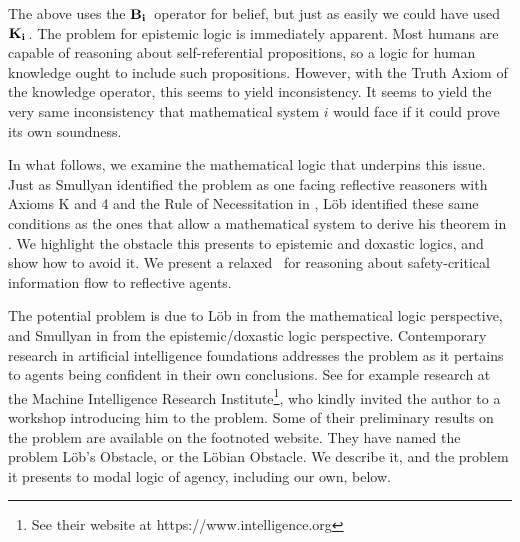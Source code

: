 The above uses the $\mathbf{B}_{\mathbf{i}}\,$ operator for belief, but just as easily we could have used $\mathbf{K}_{\mathbf{i}}\,$. The problem for epistemic logic is immediately apparent. Most humans are capable of reasoning about self-referential propositions, so a logic for human knowledge ought to include such propositions. However, with the Truth Axiom of the knowledge operator, this seems to yield inconsistency. It seems to yield the very same inconsistency that mathematical system $i$ would face if it could prove its own soundness.

In what follows, we examine the mathematical logic that underpins this issue. Just as Smullyan identified the problem as one facing reflective reasoners with Axioms K and 4 and the Rule of Necessitation in \cite{smullyan}, L\"ob identified these same conditions as the ones that allow a mathematical system to derive his theorem in \cite{Lob}. We highlight the obstacle this presents to epistemic and doxastic logics, and show how to avoid it. We present a relaxed \DASL\ for reasoning about safety-critical information flow to reflective agents.


The potential problem is due to L\"ob in \cite{Lob} from the mathematical logic perspective, and Smullyan in \cite{smullyan} from the epistemic/doxastic logic perspective. Contemporary research in artificial intelligence foundations addresses the problem as it pertains to agents being confident in their own conclusions. See for example research at the Machine Intelligence Research Institute\footnote{See their website at https://www.intelligence.org}, who kindly invited the author to a workshop introducing him to the problem. Some of their preliminary results on the problem are available on the footnoted website. They have named the problem L\"ob's Obstacle, or the L\"obian Obstacle. We describe it, and the problem it presents to modal logic of agency, including our own, below.

